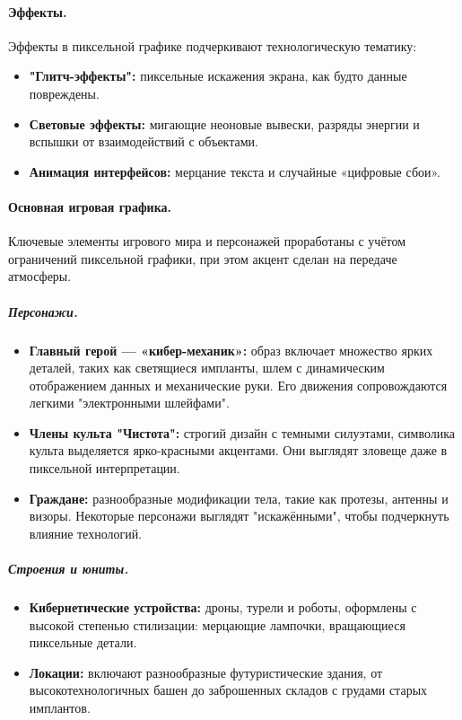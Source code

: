 \documentclass{article}
\begin{document}
\begin{itemize}
\paragraph{Эффекты.}
Эффекты в пиксельной графике подчеркивают технологическую тематику:
\begin{itemize}
    \item \textbf{"Глитч-эффекты":} пиксельные искажения экрана, как будто данные повреждены.
    \item \textbf{Световые эффекты:} мигающие неоновые вывески, разряды энергии и вспышки от взаимодействий с объектами.
    \item \textbf{Анимация интерфейсов:} мерцание текста и случайные «цифровые сбои».
\end{itemize}

\paragraph{Основная игровая графика.}
Ключевые элементы игрового мира и персонажей проработаны с учётом ограничений пиксельной графики, при этом акцент сделан на передаче атмосферы.

\subparagraph{Персонажи.}
\begin{itemize}
    \item \textbf{Главный герой — «кибер-механик»:} образ включает множество ярких деталей, таких как светящиеся импланты, шлем с динамическим отображением данных и механические руки. Его движения сопровождаются легкими "электронными шлейфами".
    \item \textbf{Члены культа "Чистота":} строгий дизайн с темными силуэтами, символика культа выделяется ярко-красными акцентами. Они выглядят зловеще даже в пиксельной интерпретации.
    \item \textbf{Граждане:} разнообразные модификации тела, такие как протезы, антенны и визоры. Некоторые персонажи выглядят "искажёнными", чтобы подчеркнуть влияние технологий.
\end{itemize}

\subparagraph{Строения и юниты.}
\begin{itemize}
    \item \textbf{Кибернетические устройства:} дроны, турели и роботы, оформлены с высокой степенью стилизации: мерцающие лампочки, вращающиеся пиксельные детали.
    \item \textbf{Локации:} включают разнообразные футуристические здания, от высокотехнологичных башен до заброшенных складов с грудами старых имплантов.
\end{itemize}


\end{itemize}
\end{document}
